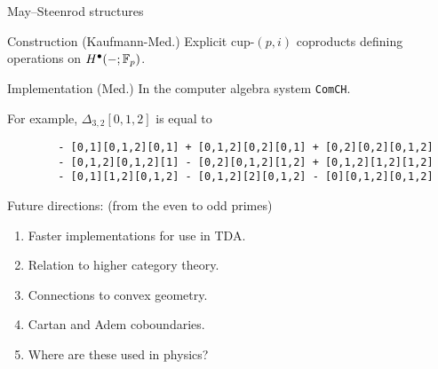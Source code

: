\begin{frame}[fragile]{May--Steenrod structures}

	\vskip-5pt\pause

	\begin{block}{Construction (Kaufmann-Med.)}
		Explicit cup-$(p,i)$ coproducts defining \textcolor{pblue}{operations} on $H^\bullet(-; {\mathbb{F}_p})$.
	\end{block}

	\pause

	\begin{block}{Implementation (Med.)}
		In the computer algebra system \textcolor{pblue}{\texttt{ComCH}}.
	\end{block}

	\pause

	For example, $\Delta_{3,2}[0,1,2]$ is equal to

	\begin{verbatim}
		- [0,1][0,1,2][0,1] + [0,1,2][0,2][0,1] + [0,2][0,2][0,1,2]
		- [0,1,2][0,1,2][1] - [0,2][0,1,2][1,2] + [0,1,2][1,2][1,2]
		- [0,1][1,2][0,1,2] - [0,1,2][2][0,1,2] - [0][0,1,2][0,1,2]
	\end{verbatim}

	\pause

	\textcolor{pblue}{Future directions:} (from the even to odd primes)

	\pause
	\begin{enumerate}
		\item Faster implementations for use in TDA. \pause \\
		\item Relation to higher category theory. \pause \\
		\item Connections to convex geometry. \pause \\
		\item Cartan and Adem coboundaries. \pause \\
		\item Where are these used in physics?
	\end{enumerate}
\end{frame}